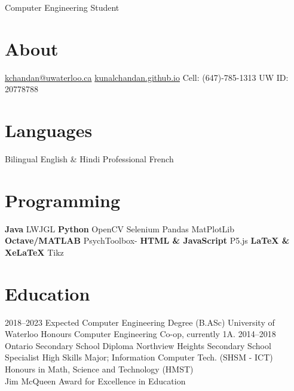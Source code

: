 \documentclass[]{chandan-cv}
\begin{document}
       {Computer Engineering Student}


\begin{aside}
  \section{About}
    \href{mailto:kchandan@uwaterloo.ca}{kchandan@uwaterloo.ca}
    \href{https://kunalchandan.github.io}{kunalchandan.github.io}
    Cell: (647)-785-1313
    UW ID: 20778788
  \section{Languages}
    Bilingual English \& Hindi
    Professional French
  \section{Programming}
    \textbf{Java}
    LWJGL
\hfill
    \textbf{Python}
    OpenCV
    Selenium
    Pandas
    MatPlotLib
\hfill
    \textbf{Octave/MATLAB}
    PsychToolbox-
\hfill
    \textbf{HTML \& JavaScript}
    P5.js
\hfill
    \textbf{LaTeX \& XeLaTeX}
    Tikz
\end{aside}

%

\section{Education}

\begin{entrylist}
  \entry
    {2018–2023}
    {Expected Computer Engineering Degree (B.ASc)}
    {University of Waterloo}
    {Honours Computer Engineering Co-op, currently 1A.}
  \entry
    {2014–2018}
    {Ontario Secondary School Diploma}
    {Northview Heights Secondary School}
    {Specialist High Skills Major; Information Computer Tech. (SHSM - ICT)
     \\Honours in Math, Science and Technology (HMST)
     \\Jim McQueen Award for Excellence in Education}
\end{entrylist}
\end{document}
